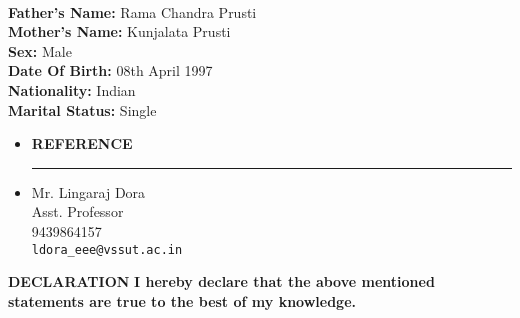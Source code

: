 \documentclass[a4paper]{article}
\begin{document}
 \hspace{0.5cm}\\[-0.2cm]
 \indent \textbf{Father's Name:} Rama Chandra Prusti\\
 \indent \textbf{Mother's Name:} Kunjalata Prusti\\
 \indent \textbf{Sex:} Male\\
 \indent \textbf{Date Of Birth:} 08th April 1997\\
 \indent \textbf{Nationality:} Indian\\
 \indent \textbf{Marital Status:} Single\\
 
 \renewcommand{\labelitemi}{\texttt{[image: jnj.JPG]}}
\begin{itemize}
  \vspace{4ex}
  \item \textbf{\huge{R}}\textbf{\large EFERENCE}
  {\color{mypink1}
  \rule{12cm}{0.5mm}}
 \end{itemize}
 \renewcommand{\labelitemi}{\textbullet}
 \begin{itemize}
   \item Mr. Lingaraj Dora\\
   \indent Asst. Professor\\
   \indent \faMobile \hspace{5pt} 9439864157\\
   \indent \faEnvelope \hspace{5pt}\texttt{ldora\_eee@vssut.ac.in}
 \end{itemize}
\vspace{1cm}
 \centering
 \textbf{\large DECLARATION}
 \justify
 \textbf{I hereby declare that the above mentioned statements are true to the best of my knowledge.}\\
\end{document}
